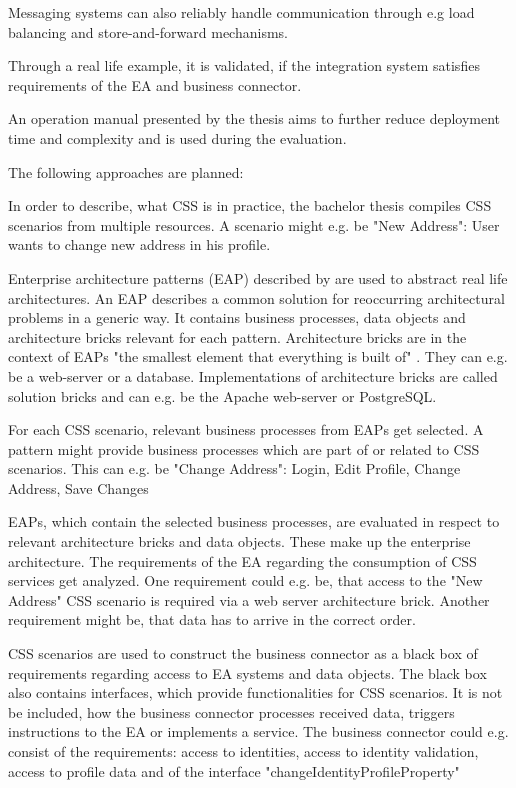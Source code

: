 \documentclass{article}
\begin{document}
Messaging systems can also reliably handle communication through e.g load balancing and store-and-forward mechanisms.

Through a real life example, it is validated, if the integration system satisfies requirements of the EA and business connector.

An operation manual presented by the thesis aims to further reduce deployment time and complexity and is used during the evaluation.

The following approaches are planned:

In order to describe, what CSS is in practice, the bachelor thesis compiles CSS scenarios from multiple
resources. A scenario might e.g. be "New Address": User wants to change new address in his profile.

Enterprise architecture patterns (EAP) described by \cite{architecturePatterns} are used to abstract
real life architectures. An EAP describes a common solution for reoccurring architectural problems in a 
generic way. It contains business processes, data objects and architecture bricks relevant for each pattern.
Architecture bricks are in the context of EAPs "the smallest element that everything is built of" 
\cite[Page 21]{architecturePatterns}. They can e.g. be a web-server or a database. Implementations of 
architecture bricks are called solution bricks and can e.g. be the Apache web-server or PostgreSQL.

For each CSS scenario, relevant business processes from EAPs get selected. A pattern might 
provide business processes which are part of or related to CSS scenarios.
This can e.g. be "Change Address": Login, Edit Profile, Change Address, Save Changes

EAPs, which contain the selected business processes, are evaluated in respect to relevant architecture 
bricks and data objects. These make up the enterprise architecture. The requirements of the EA 
regarding the consumption of CSS services get analyzed. One requirement could e.g. be, that access to 
the "New Address" CSS scenario is required via a web server architecture brick. Another requirement might be, 
that data has to arrive in the correct order.

CSS scenarios are used to construct the business connector as a black box of requirements regarding 
access to EA systems and data objects. The black box also contains interfaces, which provide functionalities for CSS 
scenarios. It is not be included, how the business 
connector processes received data, triggers instructions to the EA or implements a service.
The business connector could e.g. consist of the requirements: access to identities, access to identity validation, 
access to profile data and of the interface "changeIdentityProfileProperty"
\end{document}

